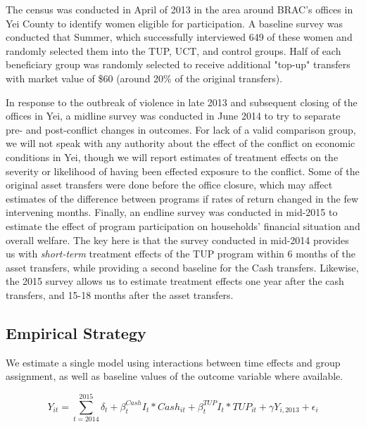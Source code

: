 \documentclass[12pt,article]{article}
\begin{document}
The census was conducted in April of 2013 in the area around BRAC's offices in Yei
County to identify women eligible for participation. A baseline survey was conducted
that Summer, which successfully interviewed 649 of these women and randomly selected
them into the TUP, UCT, and control groups. Half of each beneficiary group was
randomly selected to receive additional "top-up" transfers with market value of \$60
(around 20\% of the original transfers).

In response to the outbreak of violence in late 2013 and subsequent closing of the
offices in Yei, a midline survey was conducted in June 2014 to try to separate pre-
and post-conflict changes in outcomes. For lack of a valid comparison group, we will
not speak with any authority about the effect of the conflict on economic conditions
in Yei, though we will report estimates of treatment effects on the severity or
likelihood of having been effected exposure to the conflict. Some of the original
asset transfers were done before the office closure, which may affect estimates of
the difference between programs if rates of return changed in the few intervening
months. Finally, an endline survey was conducted in mid-2015 to estimate the effect
of program participation on households' financial situation and overall welfare. The
key here is that the survey conducted in mid-2014 provides us with \emph{short-term}
treatment effects of the TUP program within 6 months of the asset transfers, while
providing a second baseline for the Cash transfers. Likewise, the 2015 survey
allows us to estimate treatment effects one year after the cash transfers, and 15-18
months after the asset transfers.

\subsection{Empirical Strategy}
\label{sec:orgheadline5}

We estimate a single model using interactions between time effects and group
assignment, as well as baseline values of the outcome variable where available. 

\begin{equation*}
Y_{it} =\sum_{t=2014}^{2015}\delta_{t}+\beta_{t}^{Cash}I_{t}*Cash_{it}+\beta_{t}^{TUP}I_{t}*TUP_{it}+\gamma Y_{i,2013}+\epsilon_{i}
\end{equation*}
\end{document}
